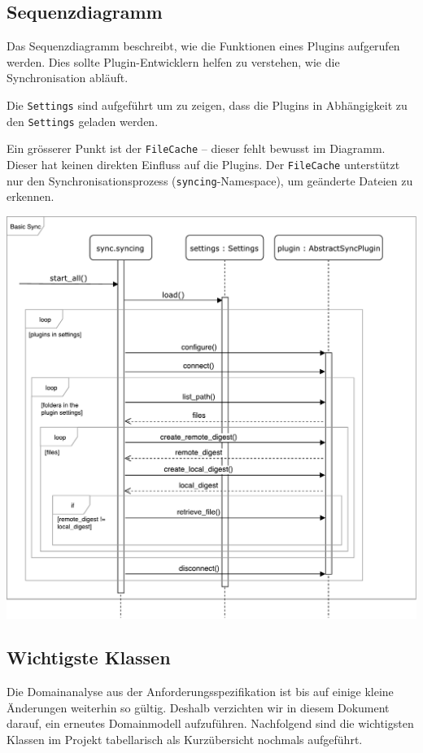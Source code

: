 \documentclass[a4paper]{article}
\begin{document}
\newpage

\subsection{Sequenzdiagramm}

Das Sequenzdiagramm beschreibt, wie die Funktionen eines Plugins aufgerufen werden.
Dies sollte Plugin-Entwicklern helfen zu verstehen, wie die Synchronisation abläuft.

Die \verb|Settings| sind aufgeführt um zu zeigen, dass die Plugins in Abhängigkeit zu den \verb|Settings| geladen werden.

Ein grösserer Punkt ist der \verb|FileCache| -- dieser fehlt bewusst im Diagramm.
Dieser hat keinen direkten Einfluss auf die Plugins.
Der \verb|FileCache| unterstützt nur den Synchronisationsprozess (\verb|syncing|-Namespace), um geänderte Dateien zu erkennen.

\includegraphics[width=40em]{./img/GrobesSequenzDiagramm.pdf}

\pagebreak
\subsection{Wichtigste Klassen}

Die Domainanalyse aus der Anforderungsspezifikation ist bis auf einige kleine
Änderungen weiterhin so gültig. Deshalb verzichten wir in diesem Dokument
darauf, ein erneutes Domainmodell aufzuführen. Nachfolgend sind die wichtigsten
Klassen im Projekt tabellarisch als Kurzübersicht nochmals aufgeführt.
\end{document}
